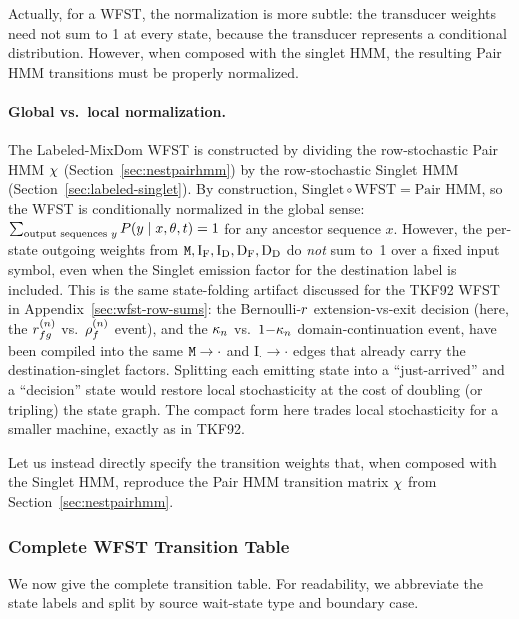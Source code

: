 Actually, for a WFST, the normalization is more subtle: the transducer weights need not
sum to 1 at every state, because the transducer represents a conditional distribution.
However, when composed with the singlet HMM, the resulting Pair HMM transitions must
be properly normalized.

\paragraph{Global vs.\ local normalization.}
The Labeled-MixDom WFST is constructed by dividing the row-stochastic Pair HMM
$\chi$ (Section~\ref{sec:nestpairhmm})
by the row-stochastic Singlet HMM (Section~\ref{sec:labeled-singlet}).
By construction, $\text{Singlet} \circ \text{WFST} = \text{Pair HMM}$, so the
WFST is conditionally normalized in the global sense:
$\sum_{\text{output sequences } y} P(y \mid x, \theta, t) = 1$
for any ancestor sequence $x$.
However, the per-state outgoing weights from ${\tt M},\mathrm{I_F},\mathrm{I_D},
\mathrm{D_F},\mathrm{D_D}$ do \emph{not} sum to~1 over a fixed input symbol, even
when the Singlet emission factor for the destination label is included.
This is the same state-folding artifact discussed for the TKF92 WFST in
Appendix~\ref{sec:wfst-row-sums}: the Bernoulli-$r$ extension-vs-exit decision
(here, the $r^{(n)}_{fg}$ vs.\ $\rho^{(n)}_f$
event), and the $\kappa_n$ vs.\ $1{-}\kappa_n$ domain-continuation event,
have been compiled into the same ${\tt M}\to\cdot$ and $\mathrm{I_\cdot}\to\cdot$
edges that already carry the destination-singlet factors.
Splitting each emitting state into a ``just-arrived'' and a ``decision'' state
would restore local stochasticity at the cost of doubling (or tripling) the state
graph. The compact form here trades local stochasticity for a smaller machine,
exactly as in TKF92.

Let us instead directly specify the transition weights that, when composed with the
Singlet HMM, reproduce the Pair HMM transition matrix $\chi$ from
Section~\ref{sec:nestpairhmm}.

\subsubsection{Complete WFST Transition Table}
\label{sec:wfst-complete}

We now give the complete transition table.
For readability, we abbreviate the state labels and split by source wait-state type and
boundary case.

